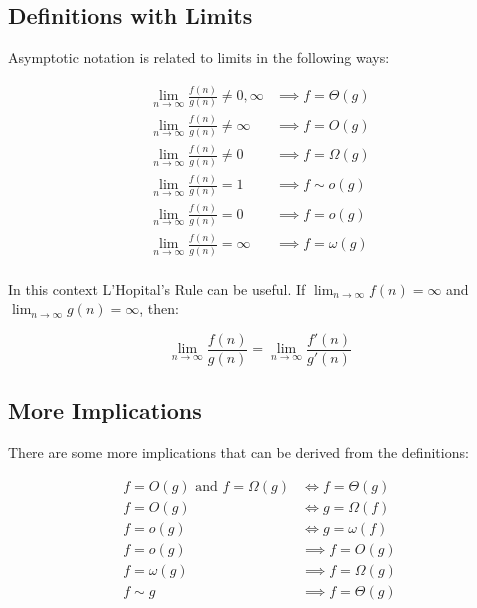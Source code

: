 \documentclass[../main.tex]{subfiles}
\begin{document}
\subsection{Definitions with Limits}
Asymptotic notation is related to limits in the following ways:
\nopagebreak

\begin{align*}
  \lim_{n \to \infty} \frac{f(n)}{g(n)} \not= 0, \infty &\implies f = \Theta(g) \\
  \lim_{n \to \infty} \frac{f(n)}{g(n)} \not= \infty    &\implies f = O(g) \\
  \lim_{n \to \infty} \frac{f(n)}{g(n)} \not= 0         &\implies f = \Omega(g) \\
  \lim_{n \to \infty} \frac{f(n)}{g(n)} = 1             &\implies f \sim o(g) \\
  \lim_{n \to \infty} \frac{f(n)}{g(n)} = 0             &\implies f = o(g) \\
  \lim_{n \to \infty} \frac{f(n)}{g(n)} = \infty        &\implies f = \omega(g) \\
\end{align*}

In this context L'Hopital's Rule can be useful. If $\lim_{n \to \infty} f(n) = \infty$ and $\lim_{n \to \infty} g(n) = \infty$, then:

$$
\lim_{n \to \infty} \frac{f(n)}{g(n)} = \lim_{n \to \infty} \frac{f'(n)}{g'(n)}
$$

\subsection{More Implications}
There are some more implications that can be derived from the definitions:

\begin{align*}
  f = O(g) \text{ and } f = \Omega(g) &\iff f = \Theta(g) \\
                             f = O(g) &\iff g = \Omega(f) \\
                             f = o(g) &\iff g = \omega(f) \\
                             f = o(g) &\implies f = O(g) \\
                        f = \omega(g) &\implies f = \Omega(g) \\
                             f \sim g &\implies f = \Theta(g) \\
\end{align*}
\end{document}
